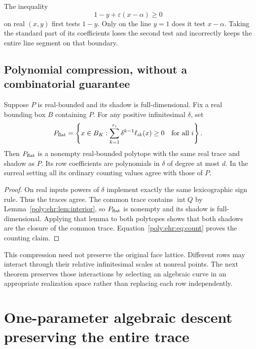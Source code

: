 \documentclass[11pt,a4paper]{article}
\numberwithin{equation}{section}
\theoremstyle{plain}
\newcommand{\eps}{\varepsilon}
\newcommand{\intr}{\operatorname{int}}
\begin{document}
\begin{example}
The inequality
\[
 1-y+\eps(x-\alpha)\geq0
\]
on real $(x,y)$ first tests $1-y$. Only on the line $y=1$ does it test
$x-\alpha$. Taking the standard part of its coefficients loses the second
test and incorrectly keeps the entire line segment on that boundary.
\end{example}

\subsection{Polynomial compression, without a combinatorial guarantee}

\begin{corollary}
\label{poly:ehr:cor:flat}
Suppose $P$ is real-bounded and its shadow is full-dimensional. Fix a real
bounding box $B$ containing $P$. For any positive infinitesimal $\delta$,
set
\[
 P_{\rm flat}=\left\{x\in B_K:
       \sum_{k=1}^{r_i}\delta^{k-1}\ell_{ik}(x)\geq0\quad\text{for all }i
                   \right\}.
\]
Then $P_{\rm flat}$ is a nonempty real-bounded polytope with the same real
trace and shadow as $P$. Its row coefficients are polynomials in $\delta$
of degree at most $d$. In the surreal setting all its ordinary counting
values agree with those of $P$.
\end{corollary}
\begin{proof}
On real inputs powers of $\delta$ implement exactly the same lexicographic
sign rule. Thus the traces agree. The common trace contains $\intr Q$ by
Lemma~\ref{poly:ehr:lem:interior}, so $P_{\rm flat}$ is nonempty and its shadow is
full-dimensional. Applying that lemma to both polytopes shows that both
shadows are the closure of the common trace. Equation~\eqref{poly:ehr:eq:count}
proves the counting claim.
\end{proof}

This compression need not preserve the original face lattice. Different
rows may interact through their relative infinitesimal scales at nonreal
points. The next theorem preserves those interactions by selecting an
algebraic curve in an appropriate realization space rather than replacing
each row independently.

\section{One-parameter algebraic descent preserving the entire trace}
\label{poly:ehr:sec:descent}
\end{document}
